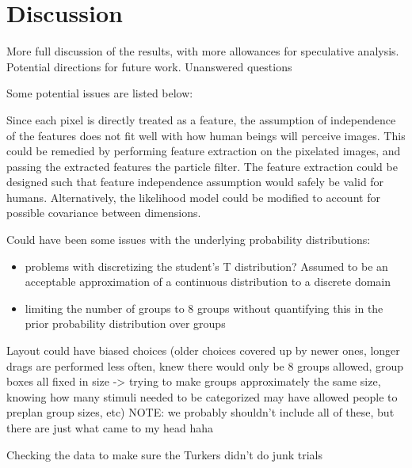\section*{Discussion}
\label{sec:discussion}

More full discussion of the results, with more allowances for speculative
analysis.  Potential directions for future work.  Unanswered questions

Some potential issues are listed below:

Since each pixel is directly treated as a feature, the assumption of
independence of the features does not fit well with how human beings will
perceive images.  This could be remedied by performing feature extraction on the
pixelated images, and passing the extracted features the particle filter.  The
feature extraction could be designed such that feature independence assumption
would safely be valid for humans. Alternatively, the likelihood model could be
modified to account for possible covariance between dimensions.

Could have been some issues with the underlying probability
distributions:
\begin{itemize}
\item problems with discretizing the student's T distribution? Assumed to be an
  acceptable approximation of a continuous distribution to a discrete domain
\item limiting the number of groups to 8 groups without quantifying this in the
  prior probability distribution over groups
\end{itemize}

Layout could have biased choices (older choices covered up by newer ones,
longer drags are performed less often, knew there would only be 8 groups
allowed, group boxes all fixed in size -> trying to make groups approximately
the same size, knowing how many stimuli needed to be categorized may have
allowed people to preplan group sizes, etc) NOTE: we probably shouldn't include
all of these, but there are just what came to my head haha

Checking the data to make sure the Turkers didn't do junk trials